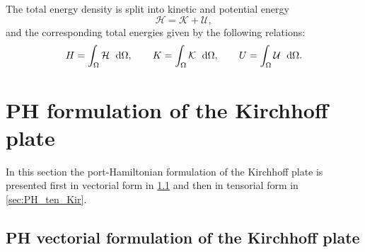 \documentclass[11pt]{article}
\begin{document}
	The total energy density is split into kinetic and potential energy
	\begin{equation}
	\mathcal{H} = \mathcal{K} + \mathcal{U},
	\end{equation}
	and the corresponding total energies given by the following relations:
	\begin{equation}
	H = \int_{\Omega} \mathcal{H} \ \d{\Omega}, \qquad K = \int_{\Omega} \mathcal{K} \ \d{\Omega}, \qquad U = \int_{\Omega} \mathcal{U} \ \d{\Omega}.
	\end{equation}
	
	
	\section{PH formulation of the Kirchhoff plate}
	In this section the port-Hamiltonian formulation of the Kirchhoff plate is presented first in vectorial form  in \ref{sec:PH_vec_Kir} and then in tensorial form in \ref{sec:PH_ten_Kir}.
	
	\subsection{PH vectorial formulation of the Kirchhoff plate}
	\label{sec:PH_vec_Kir}
	
\end{document}
